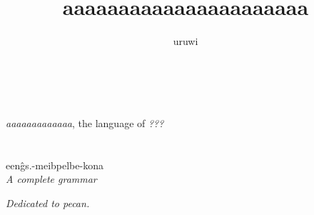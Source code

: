 \documentclass{book}
\title{aaaaaaaaaaaaaaaaaaaaaa}
\author{uruwi}
\newcommand{\lname}{aaaaaaaaaaaaa}
\begin{document}
\pagecolor{Chartreuse1!25}

\begin{titlepage}
  \makeatletter
  \begin{center}
    {\color{Green3} \hprule \vspace{1.5ex} \\}
    {\Huge \sffamily \textcolor{SpringGreen4}{\@title} \\}
    {\large \textit{\lname}, the language of \textit{???} \\}
    {\color{Green3} \hprule \vspace{1.5ex} \\}
    \vspace{1.5cm}
    {\Large\bfseries \@author}\\[5pt]
    \vspace{2cm}
    \textnormal{een\^gs.-meibpelbe-kona} \\[5pt]
    \emph{A complete grammar}\\[2cm]
    \vfill
    \vfill
    {\@date}
  \end{center}
  \makeatother
\end{titlepage}

\pagecolor{Chartreuse1!15}

\begin{center}
    \textit{Dedicated to pecan.}
\end{center}
\end{document}
